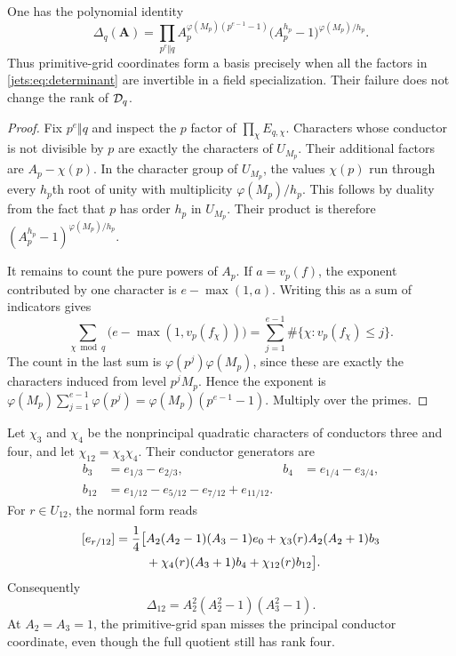 \begin{theorem}\label{jets:thm:determinant}
One has the polynomial identity
\begin{equation}\label{jets:eq:determinant}
 \boxed{\displaystyle
 \Delta_q(\mathbf A)=
 \prod_{p^e\Vert q}
 A_p^{\varphi(M_p)(p^{e-1}-1)}
 \bigl(A_p^{h_p}-1\bigr)^{\varphi(M_p)/h_p}.}
\end{equation}
Thus primitive-grid coordinates form a basis precisely when all the
factors in \eqref{jets:eq:determinant} are invertible in a field
specialization. Their failure does not change the rank of $\mathcal D_q$.
\end{theorem}
\begin{proof}
Fix $p^e\Vert q$ and inspect the $p$ factor of
$\prod_\chi E_{q,\chi}$. Characters whose conductor is not divisible by
$p$ are exactly the characters of $U_{M_p}$. Their additional factors
are $A_p-\chi(p)$. In the character group of $U_{M_p}$, the values
$\chi(p)$ run through every $h_p$th root of unity with multiplicity
$\varphi(M_p)/h_p$. This follows by duality from the fact that $p$ has
order $h_p$ in $U_{M_p}$. Their product is therefore
$(A_p^{h_p}-1)^{\varphi(M_p)/h_p}$.

It remains to count the pure powers of $A_p$. If $a=v_p(f)$, the
exponent contributed by one character is $e-\max(1,a)$. Writing this
as a sum of indicators gives
\[
 \sum_{\chi\bmod q}\bigl(e-\max(1,v_p(f_\chi))\bigr)
 =\sum_{j=1}^{e-1}\#\{\chi:v_p(f_\chi)\le j\}.
\]
The count in the last sum is $\varphi(p^j)\varphi(M_p)$, since these
are exactly the characters induced from level $p^jM_p$. Hence the
exponent is
$\varphi(M_p)\sum_{j=1}^{e-1}\varphi(p^j)
=\varphi(M_p)(p^{e-1}-1)$. Multiply over the primes.
\end{proof}

\begin{example}
Let $\chi_3$ and $\chi_4$ be the nonprincipal quadratic characters of
conductors three and four, and let $\chi_{12}=\chi_3\chi_4$.
Their conductor generators are
\begin{align*}
 b_3&=e_{1/3}-e_{2/3},&
 b_4&=e_{1/4}-e_{3/4},\\
 b_{12}&=e_{1/12}-e_{5/12}-e_{7/12}+e_{11/12}.
\end{align*}
For $r\in U_{12}$, the normal form reads
\begin{align}\label{jets:eq:q12-normal}
 [e_{r/12}]=\frac14\bigl[&A_2(A_2-1)(A_3-1)e_0
 +\chi_3(r)A_2(A_2+1)b_3\notag\\
 &+\chi_4(r)(A_3+1)b_4+\chi_{12}(r)b_{12}\bigr].
\end{align}
Consequently
\[
 \Delta_{12}=A_2^2(A_2^2-1)(A_3^2-1).
\]
At $A_2=A_3=1$, the primitive-grid span misses the principal conductor
coordinate, even though the full quotient still has rank four.
\end{example}

